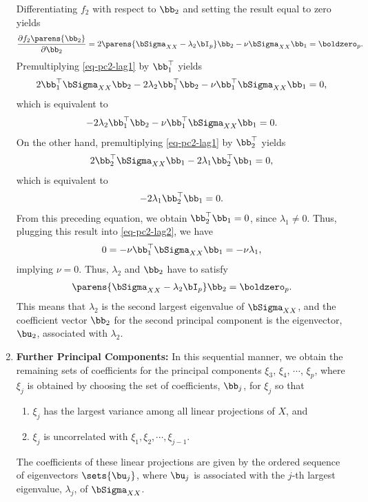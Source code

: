 \documentclass[12pt]{article}
\begin{document}
\begin{enumerate}[label=\textbf{\arabic*.}]
	Differentiating $f_2$ with respect to $\bb_2$ and setting the result equal to zero yields 
	\begin{align}\label{eq-pc2-lag1}
		\frac{\partial f_2 \parens{\bb_2}}{\partial \bb_2} = 2 \parens{\bSigma_{XX} - \lambda_2 \bI_p} \bb_2 - \nu \bSigma_{XX} \bb_1 = \boldzero_p. 
	\end{align}
	Premultiplying \eqref{eq-pc2-lag1} by $\bb_1^\top$ yields 
	\begin{align*}
		2 \bb_1^\top \bSigma_{XX} \bb_2 - 2 \lambda_2 \bb_1^\top \bb_2 - \nu \bb_1^\top \bSigma_{XX} \bb_1 = 0, 
	\end{align*}
	which is equivalent to 
	\begin{align}\label{eq-pc2-lag2}
		- 2 \lambda_2 \bb_1^\top \bb_2 - \nu \bb_1^\top \bSigma_{XX} \bb_1 = 0. 
	\end{align}
	On the other hand, premultiplying \eqref{eq-pc2-lag1} by $\bb_2^\top$ yields 
	\begin{align*}
		2 \bb_2^\top \bSigma_{XX} \bb_1 - 2 \lambda_1 \bb_2^\top \bb_1 = 0, 
	\end{align*}
	which is equivalent to 
	\begin{align*}
		- 2 \lambda_1 \bb_2^\top \bb_1 = 0. 
	\end{align*}
	From this preceding equation, we obtain $\bb_2^\top \bb_1 = 0$, since $\lambda_1 \neq 0$. Thus, plugging this result into \eqref{eq-pc2-lag2}, we have 
	\begin{align*}
		0 = - \nu \bb_1^\top \bSigma_{XX} \bb_1 = - \nu \lambda_1, 
	\end{align*}
	implying $\nu = 0$. Thus, $\lambda_2$ and $\bb_2$ have to satisfy 
	\begin{align*}
		\parens{\bSigma_{XX} - \lambda_2 \bI_p} \bb_2 = \boldzero_p. 
	\end{align*}
	This means that $\lambda_2$ is the second largest eigenvalue of $\bSigma_{XX}$, and the coefficient vector $\bb_2$ for the second principal component is the eigenvector, $\bu_2$, associated with $\lambda_2$. 
	
	\item \textbf{Further Principal Components:} In this sequential manner, we obtain the remaining sets of coefficients for the principal components $\xi_3$, $\xi_4$, $\cdots$, $\xi_p$, where $\xi_j$ is obtained by choosing the set of coefficients, $\bb_j$, for $\xi_j$ so that 
	\begin{enumerate}
		\item $\xi_j$ has the largest variance among all linear projections of $X$, and 
		\item $\xi_j$ is uncorrelated with $\xi_1, \xi_2, \cdots, \xi_{j-1}$. 
	\end{enumerate}
	The coefficients of these linear projections are given by the ordered sequence of eigenvectors $\sets{\bu_j}$, where $\bu_j$ is associated with the $j$-th largest eigenvalue, $\lambda_j$, of $\bSigma_{XX}$. 
	
\end{enumerate}
\end{document}
